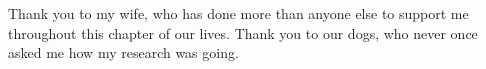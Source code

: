 \begin{frontmatter}
\begin{acknowledgments}
    Thank you to my wife, who has done more than anyone else to support me throughout this chapter of our lives. Thank you to our dogs, who never once asked me how my research was going.

\end{acknowledgments}

% 


\end{frontmatter}
